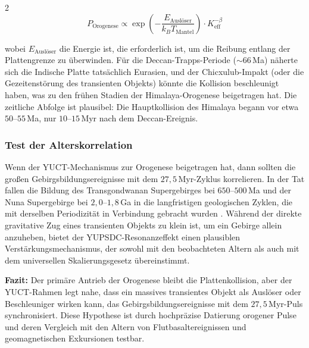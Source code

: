 \documentclass[11pt,a4paper]{article}
\begin{document}
\begin{multicols}{2}
		\begin{equation}
			P_{\text{Orogenese}} \propto \exp\left(-\frac{E_{\text{Auslöser}}}{k_B T_{\text{Mantel}}}\right) \cdot K_{\mathrm{eff}}^{-\beta}
		\end{equation}
		
		wobei \(E_{\text{Auslöser}}\) die Energie ist, die erforderlich ist, um die Reibung entlang der Plattengrenze zu überwinden. Für die Deccan-Trapps-Periode (\(\sim 66\) Ma) näherte sich die Indische Platte tatsächlich Eurasien, und der Chicxulub-Impakt (oder die Gezeitenstörung des transienten Objekts) könnte die Kollision beschleunigt haben, was zu den frühen Stadien der Himalaya-Orogenese beigetragen hat. Die zeitliche Abfolge ist plausibel: Die Hauptkollision des Himalaya begann vor etwa \(50\)–\(55\) Ma, nur \(10\)–\(15\) Myr nach dem Deccan-Ereignis.
		
		\subsubsection{Test der Alterskorrelation}
		
		Wenn der YUCT-Mechanismus zur Orogenese beigetragen hat, dann sollten die großen Gebirgsbildungsereignisse mit dem \(27,5\) Myr-Zyklus korrelieren. In der Tat fallen die Bildung des Transgondwanan Supergebirges bei \(650\)–\(500\) Ma und der Nuna Supergebirge bei \(2,0\)–\(1,8\) Ga \cite{CampbellAllen2008} in die langfristigen geologischen Zyklen, die mit derselben Periodizität in Verbindung gebracht wurden \cite{Rampino2021}. Während der direkte gravitative Zug eines transienten Objekts zu klein ist, um ein Gebirge allein anzuheben, bietet der YUPSDC-Resonanzeffekt einen plausiblen Verstärkungsmechanismus, der sowohl mit den beobachteten Altern als auch mit dem universellen Skalierungsgesetz übereinstimmt.
		
		\vspace{0.3cm}
		\noindent
		\textbf{Fazit:} Der primäre Antrieb der Orogenese bleibt die Plattenkollision, aber der YUCT-Rahmen legt nahe, dass ein massives transientes Objekt als Auslöser oder Beschleuniger wirken kann, das Gebirgsbildungsereignisse mit dem \(27,5\) Myr-Puls synchronisiert. Diese Hypothese ist durch hochpräzise Datierung orogener Pulse und deren Vergleich mit den Altern von Flutbasaltereignissen und geomagnetischen Exkursionen testbar.
		
	\end{multicols}
	
\end{document}
